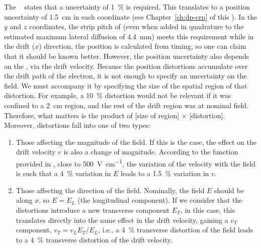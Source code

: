 The  ~\cite{Acciarri:2015uup} states that a  uncertainty of \SI{1}{\%} is required. 
This translates to a position uncertainty of \SI{1.5}{\cm} in each coordinate %
(see Chapter~\ref{ch:dp-crp} of this ). In the $y$ and $z$ coordinates, the  strip pitch of \dpstrippitch (even when added in quadrature to the estimated maximum lateral diffusion of \SI{4.4}{\milli\m}) meets this requirement while in the drift ($x$) direction, the position is calculated from timing, so one can claim that it should be known better.
However, the position uncertainty also depends on the \efield, via the drift velocity. Because the position distortions accumulate over the drift path of the electron, it is not enough to specify an uncertainty on the field. We must accompany it by specifying the size of the spatial region of that distortion. For example, a \SI{10}{\%} distortion would not be relevant if it was confined to a \SI{2}{\cm} region, and the rest of the drift region was at nominal field.
Therefore, what matters is the product of [size of region] $\times$ [distortion]. Moreover, distortions fall into one of two types:
\begin{enumerate}
\item Those affecting the magnitude of the field. If this is the case, the effect on the drift velocity $v$ is also a change of magnitude. According to the function provided in \cite{Walkowiak:2000wf}, close to \SI{500}{\V\per\cm}, the variation of the velocity with the field is such that a \SI{4}{\%} variation in $E$ leads to a \SI{1.5}{\%} variation in $v$.
\item Those affecting the direction of the field. Nominally, the field $E$ should be along $x$, so $E = E_L$ (the longitudinal component). If we consider that the distortions introduce a new transverse component $E_T$, in this case, this translates directly into the same effect in the drift velocity, gaining a $v_T$ component, $v_T=v_L  E_T/E_L $, i.e., a \SI{4}{\%} transverse distortion of the field leads to a \SI{4}{\%} transverse distortion of the drift velocity.
\end{enumerate}

